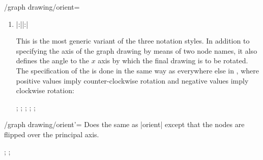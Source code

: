 \begin{key}{/graph drawing/orient=}
\begin{enumerate}
  \item {}|:||:| 

    This is the most generic variant of the three notation styles. In
    addition to specifying the axis of the graph drawing by means of two node names,
    it also defines the angle to the $x$ axis by which the final drawing 
    is to be rotated. The specification of the  is done in the
    same way as everywhere else in \tikzname, where positive values imply
    counter-clockwise rotation and negative values imply clockwise
    rotation:
\begin{codeexample}[]
\tikz {};
\tikz {};
\tikz {};
\tikz {};
\tikz {};
\end{codeexample}
  \end{enumerate}
\end{key}

\begin{key}{/graph drawing/orient'=}
  Does the same as |orient| except that the nodes are flipped over the
  principal axis.
\begin{codeexample}[]
\tikz {};
\tikz {};
\end{codeexample}
\end{key}





